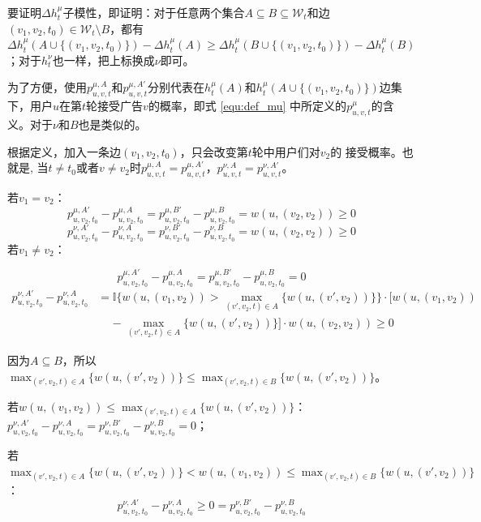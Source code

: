 要证明$\Delta h_t^\mu$子模性，即证明：对于任意两个集合$A\subseteq B \subseteq \mathcal{W}_t$和边$(v_1,v_2,t_0) \in \mathcal{W}_t \setminus B$，都有$\Delta h_t^\mu(A \cup \{(v_1,v_2,t_0)\})-\Delta h_t^\mu(A) \ge \Delta h_t^\mu(B\cup \{(v_1,v_2,t_0)\})- \Delta h_t^\mu(B)$；对于$h_t^\nu$也一样，把上标换成$\nu$即可。

为了方便，使用$p_{u,v,t}^{\mu,A}$和$p_{u,v,t}^{\mu,A'}$分别代表在$h_t^\mu(A)$和$h_t^\mu(A\cup\{(v_1,v_2,t_0)\})$边集下，用户$u$在第$t$轮接受广告$v$的概率，即式 \ref{equ:def_mu} 中所定义的$p_{u,v,t}^\mu$的含义。对于$\nu$和$B$也是类似的。

根据定义，加入一条边$(v_1,v_2,t_0)$，只会改变第$t$轮中用户们对$v_2$的 接受概率。也就是, 当$t\ne t_0$或者$v \ne v_2$时$p_{u,v,t}^{\mu,A}=p_{u,v,t}^{\mu,A'}$，$p_{u,v,t}^{\nu,A}=p_{u,v,t}^{\nu,A'}$。

若$v_1=v_2$：
\begin{equation}
p_{u,v_2,t_0}^{\mu,A'}-p_{u,v_2,t_0}^{\mu,A}=p_{u,v_2,t_0}^{\mu,B'}-p_{u,v_2,t_0}^{\mu,B} =w(u,(v_2,v_2)) \ge 0
\end{equation}
\begin{equation}
p_{u,v_2,t_0}^{\nu,A'}-p_{u,v_2,t_0}^{\nu,A}=p_{u,v_2,t_0}^{\nu,B'}-p_{u,v_2,t_0}^{\nu,B} =w(u,(v_2,v_2)) \ge 0
\end{equation}
若$v_1 \ne v_2$：

\begin{equation}
    p_{u,v_2,t_0}^{\mu,A'}-p_{u,v_2,t_0}^{\mu,A}=p_{u,v_2,t_0}^{\mu,B'}-p_{u,v_2,t_0}^{\mu,B} = 0 
\end{equation}
\begin{align}
    p_{u,v_2,t_0}^{\nu,A'}-p_{u,v_2,t_0}^{\nu,A}&=\mathbb{I}\{w(u,(v_1,v_2))>\max_{(v',v_2,t)\in A}\{w(u,(v',v_2))\}\} \cdot [w(u,(v_1,v_2)) \nonumber \\ 
    & \ \ \ \ \ -\max_{(v',v_2,t)\in A}\{w(u,(v',v_2))\}] \cdot w(u,(v_2,v_2)) \ge  0
\end{align}

因为$A \subseteq B$，所以$\max_{(v',v_2,t)\in A}\{w(u,(v',v_2))\} \le \max_{(v',v_2,t)\in B}\{w(u,(v',v_2))\}$。

若$w(u,(v_1,v_2))\le \max_{(v',v_2,t)\in A}\{w(u,(v',v_2))\}$：$p_{u,v_2,t_0}^{\nu,A'}-p_{u,v_2,t_0}^{\nu,A}=p_{u,v_2,t_0}^{\nu,B'}-p_{u,v_2,t_0}^{\nu,B}=0$；

若$\max_{(v',v_2,t)\in A}\{w(u,(v',v_2))\} < w(u,(v_1,v_2)) \le \max_{(v',v_2,t)\in B}\{w(u,(v',v_2))\}$：
\begin{equation}
p_{u,v_2,t_0}^{\nu,A'}-p_{u,v_2,t_0}^{\nu,A}\ge 0 = p_{u,v_2,t_0}^{\nu,B'}-p_{u,v_2,t_0}^{\nu,B}
\end{equation}


